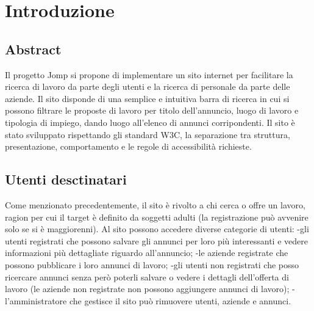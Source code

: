 \section{Introduzione}
	\subsection{Abstract}
	Il progetto Jomp si propone di implementare un sito internet per facilitare la ricerca di lavoro da parte degli utenti e la ricerca di personale da parte delle aziende. Il sito disponde di una semplice e intuitiva barra di ricerca in cui si possono filtrare le proposte di lavoro per titolo dell'annuncio, luogo di lavoro e tipologia di impiego, dando luogo all'elenco di annunci corripondenti.
	Il sito è stato sviluppato rispettando gli standard W3C, la separazione tra struttura, presentazione, comportamento e le regole di accessibilità richieste. 
	\subsection{Utenti desctinatari}
	Come menzionato precedentemente, il sito è rivolto a chi cerca o offre un lavoro, ragion per cui il target è definito da soggetti adulti (la registrazione può avvenire solo se si è maggiorenni).
Al sito possono accedere diverse categorie di utenti: 
-gli utenti registrati che possono salvare gli annunci per loro più interessanti e vedere informazioni più dettagliate riguardo all'annuncio; 
-le aziende registrate che possono pubblicare i loro annunci di lavoro;
-gli utenti non registrati che posso ricercare annunci senza però poterli salvare o vedere i dettagli dell'offerta di lavoro (le aziende non registrate non possono aggiungere annunci di lavoro); 
-l'amministratore che gestisce il sito può rimuovere utenti, aziende e annunci.

